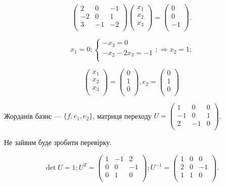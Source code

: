 $$\begin{pmatrix}
	2  & 0  & -1 \\
	-2 & 0  & 1  \\
	3  & -1 & -2 \\
\end{pmatrix} \begin{pmatrix}
	x_1 \\
	x_2 \\
	x_3 \\
\end{pmatrix} = \begin{pmatrix}
	0 \\
	0 \\
	-1 \\
\end{pmatrix}.$$

$$x_1 = 0; \left\{\begin{matrix}
	-x_3 = 0 \\
	-x_2 - 2x_3 = -1 \\
\end{matrix} \right.; \Rightarrow x_2 = 1;$$

$$\begin{pmatrix}
	x_1 \\
	x_2 \\
	x_3 \\
\end{pmatrix} = \begin{pmatrix}
	0 \\
	1 \\
	0 \\
\end{pmatrix}, e_2 = \begin{pmatrix}
	0 \\
	1 \\
	0 \\
\end{pmatrix}$$

Жорданів базис --- $\{f, e_1, e_2\}$, матриця переходу $U = \begin{pmatrix}
	 1 &  0 & 0 \\
	-1 &  0 & 1 \\
	 2 & -1 & 0 \\
\end{pmatrix}$.

Не зайвим буде зробити перевірку.

$$\det U = 1; U^{T} = \begin{pmatrix}
	1 & -1 & 2 \\
	0 & 0  & -1 \\
	0 & 1  & 0 \\
\end{pmatrix}; U^{-1} = \begin{pmatrix}
	1 & 0 & 0 \\
	2 & 0 & -1 \\
	1 & 1 & 0 \\
\end{pmatrix}. $$

